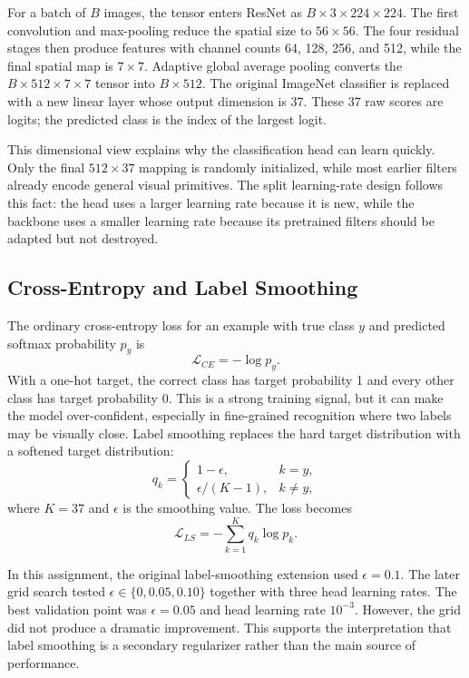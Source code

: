 \documentclass[10pt,twocolumn]{article}
\begin{document}
For a batch of $B$ images, the tensor enters ResNet as $B \times 3 \times 224 \times 224$. The first convolution and max-pooling reduce the spatial size to $56 \times 56$. The four residual stages then produce features with channel counts 64, 128, 256, and 512, while the final spatial map is $7 \times 7$. Adaptive global average pooling converts the $B \times 512 \times 7 \times 7$ tensor into $B \times 512$. The original ImageNet classifier is replaced with a new linear layer whose output dimension is 37. These 37 raw scores are logits; the predicted class is the index of the largest logit.

This dimensional view explains why the classification head can learn quickly. Only the final $512 \times 37$ mapping is randomly initialized, while most earlier filters already encode general visual primitives. The split learning-rate design follows this fact: the head uses a larger learning rate because it is new, while the backbone uses a smaller learning rate because its pretrained filters should be adapted but not destroyed.

\subsection{Cross-Entropy and Label Smoothing}

The ordinary cross-entropy loss for an example with true class $y$ and predicted softmax probability $p_y$ is
\begin{equation}
\mathcal{L}_{CE}=-\log p_y.
\end{equation}
With a one-hot target, the correct class has target probability 1 and every other class has target probability 0. This is a strong training signal, but it can make the model over-confident, especially in fine-grained recognition where two labels may be visually close. Label smoothing replaces the hard target distribution with a softened target distribution:
\begin{equation}
q_k =
\begin{cases}
1-\epsilon, & k=y,\\
\epsilon/(K-1), & k\ne y,
\end{cases}
\end{equation}
where $K=37$ and $\epsilon$ is the smoothing value. The loss becomes
\begin{equation}
\mathcal{L}_{LS}=-\sum_{k=1}^{K}q_k\log p_k.
\end{equation}

In this assignment, the original label-smoothing extension used $\epsilon=0.1$. The later grid search tested $\epsilon \in \{0,0.05,0.10\}$ together with three head learning rates. The best validation point was $\epsilon=0.05$ and head learning rate $10^{-3}$. However, the grid did not produce a dramatic improvement. This supports the interpretation that label smoothing is a secondary regularizer rather than the main source of performance.
\end{document}
